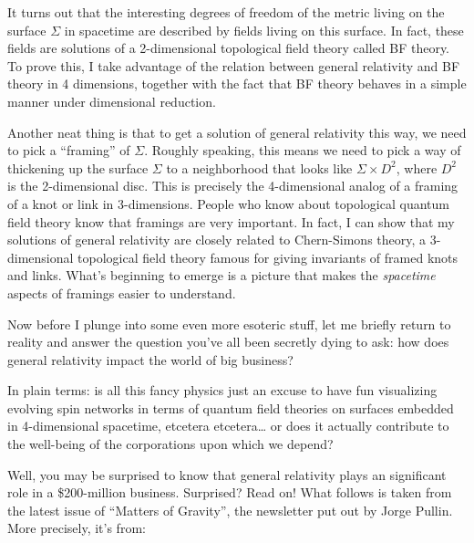 \documentclass{article}
\def\tightlist{}
\renewcommand{\texttt}[1]{%
  \begingroup
  \ttfamily
  \begingroup\lccode`~=`/\lowercase{\endgroup\def~}{/\discretionary{}{}{}}%
  \begingroup\lccode`~=`[\lowercase{\endgroup\def~}{[\discretionary{}{}{}}%
  \begingroup\lccode`~=`.\lowercase{\endgroup\def~}{.\discretionary{}{}{}}%
  \catcode`/=\active\catcode`[=\active\catcode`.=\active
  \scantokens{#1\noexpand}%
  \endgroup
}
\begin{document}
It turns out that the interesting degrees of freedom of the metric
living on the surface \(\Sigma\) in spacetime are described by fields
living on this surface. In fact, these fields are solutions of a
2-dimensional topological field theory called BF theory. To prove this,
I take advantage of the relation between general relativity and BF
theory in 4 dimensions, together with the fact that BF theory behaves in
a simple manner under dimensional reduction.

Another neat thing is that to get a solution of general relativity this
way, we need to pick a ``framing'' of \(\Sigma\). Roughly speaking, this
means we need to pick a way of thickening up the surface \(\Sigma\) to a
neighborhood that looks like \(\Sigma\times D^2\), where \(D^2\) is the
2-dimensional disc. This is precisely the 4-dimensional analog of a
framing of a knot or link in 3-dimensions. People who know about
topological quantum field theory know that framings are very important.
In fact, I can show that my solutions of general relativity are closely
related to Chern-Simons theory, a 3-dimensional topological field theory
famous for giving invariants of framed knots and links. What's beginning
to emerge is a picture that makes the \emph{spacetime} aspects of
framings easier to understand.

Now before I plunge into some even more esoteric stuff, let me briefly
return to reality and answer the question you've all been secretly dying
to ask: how does general relativity impact the world of big business?

In plain terms: is all this fancy physics just an excuse to have fun
visualizing evolving spin networks in terms of quantum field theories on
surfaces embedded in 4-dimensional spacetime, etcetera etcetera\ldots{}
or does it actually contribute to the well-being of the corporations
upon which we depend?

Well, you may be surprised to know that general relativity plays an
significant role in a \$200-million business. Surprised? Read on! What
follows is taken from the latest issue of ``Matters of Gravity'', the
newsletter put out by Jorge Pullin. More precisely, it's from:

\end{document}

